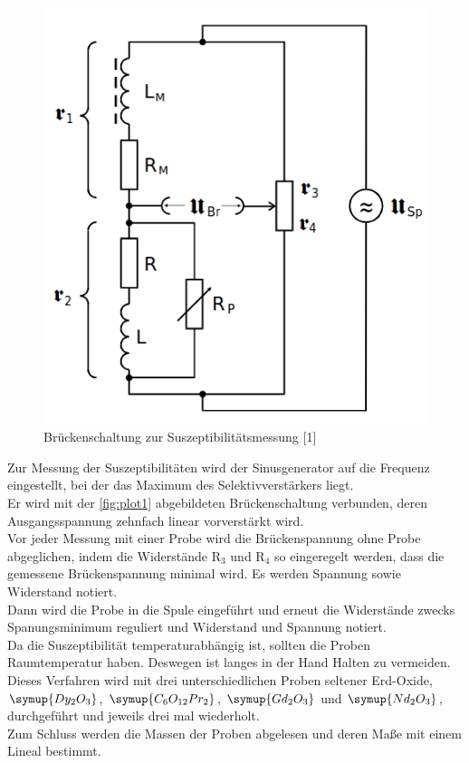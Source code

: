 \begin{figure} [H]
    \centering
    \includegraphics[width=\textwidth]{content/bild1.png}
    \caption{Brückenschaltung zur Suszeptibilitätsmessung [1]}
    \label{fig:plot1}
  \end{figure}

Zur Messung der Suszeptibilitäten wird der Sinusgenerator auf die Frequenz
eingestellt, bei der das Maximum des Selektivverstärkers liegt.\\
Er wird mit der \autoref{fig:plot1} abgebildeten Brückenschaltung verbunden, deren Ausgangsspannung zehnfach linear vorverstärkt 
wird. \\
Vor jeder Messung mit einer Probe wird die Brückenspannung ohne Probe abgeglichen, 
indem die Widerstände R$_3$ und R$_4$ so eingeregelt werden, dass die gemessene Brückenspannung minimal wird.
Es werden Spannung sowie Widerstand notiert. \\
Dann wird die Probe in die Spule eingeführt und erneut die Widerstände zwecks Spanungsminimum reguliert und 
Widerstand und Spannung notiert.\\
Da die Suszeptibilität temperaturabhängig ist, sollten die Proben Raumtemperatur haben. Deswegen ist langes in der Hand Halten zu vermeiden.\\

Dieses Verfahren wird mit drei unterschiedlichen Proben seltener Erd-Oxide, $\symup{Dy_2O_3}$, $\symup{C_6O_{12}Pr_2}$, 
$\symup{Gd_2O_3}$ und $\symup{Nd_2O_3}$, durchgeführt und jeweils drei mal wiederholt.\\
Zum Schluss werden die Massen der Proben abgelesen und deren Maße mit einem Lineal bestimmt.\\